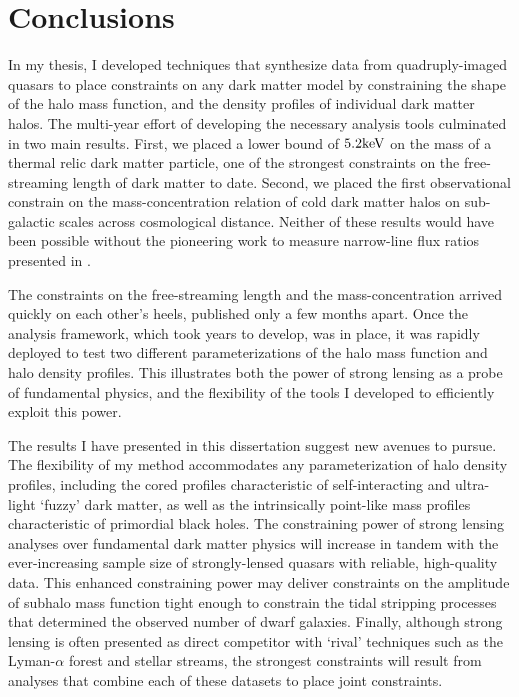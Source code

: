 \chapter{Conclusions}

In my thesis, I developed techniques that synthesize data from quadruply-imaged quasars to place constraints on any dark matter model by constraining the shape of the halo mass function, and the density profiles of individual dark matter halos. The multi-year effort of developing the necessary analysis tools culminated in two main results. First, we placed a lower bound of $5.2 \rm{keV}$ on the mass of a thermal relic dark matter particle, one of the strongest constraints on the free-streaming length of dark matter to date. Second, we placed the first observational constrain on the mass-concentration relation of cold dark matter halos on sub-galactic scales across cosmological distance. Neither of these results would have been possible without the pioneering work to measure narrow-line flux ratios presented in \cite{Nierenberg++19}. 

The constraints on the free-streaming length and the mass-concentration arrived quickly on each other's heels, published only a few months apart. Once the analysis framework, which took years to develop, was in place, it was rapidly deployed to test two different parameterizations of the halo mass function and halo density profiles. This illustrates both the power of strong lensing as a probe of fundamental physics, and the flexibility of the tools I developed to efficiently exploit this power. 

The results I have presented in this dissertation suggest new avenues to pursue. The flexibility of my method accommodates any parameterization of halo density profiles, including the cored profiles characteristic of self-interacting and ultra-light `fuzzy' dark matter, as well as the intrinsically point-like mass profiles characteristic of primordial black holes. The constraining power of strong lensing analyses over fundamental dark matter physics will increase in tandem with the ever-increasing sample size of strongly-lensed quasars with reliable, high-quality data. This enhanced constraining power may deliver constraints on the amplitude of subhalo mass function tight enough to constrain the tidal stripping processes that determined the observed number of dwarf galaxies. Finally, although strong lensing is often presented as direct competitor with `rival' techniques such as the Lyman-$\alpha$ forest and stellar streams, the strongest constraints will result from analyses that combine each of these datasets to place joint constraints. 
